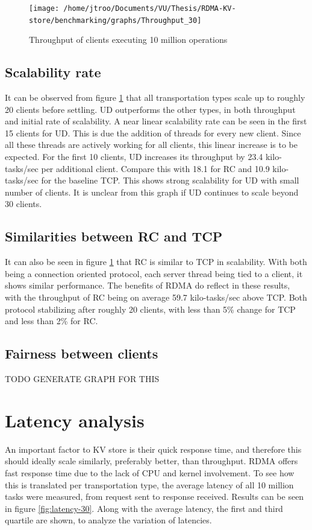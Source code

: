 \begin{figure}
    \centering
    \texttt{[image: /home/jtroo/Documents/VU/Thesis/RDMA-KV-store/benchmarking/graphs/Throughput\_30]}
    \caption{Throughput of clients executing 10 million operations}
    \label{fig:throughput-30}
\end{figure}

\subsection{Scalability rate}\label{subsec:scalability-rate}
It can be observed from figure \ref{fig:throughput-30} that all transportation types scale up to roughly 20 clients before settling.
UD outperforms the other types, in both throughput and initial rate of scalability.
A near linear scalability rate can be seen in the first 15 clients for UD.
This is due the addition of threads for every new client.
Since all these threads are actively working for all clients, this linear increase is to be expected.
For the first 10 clients, UD increases its throughput by 23.4 kilo-tasks/sec per additional client.
Compare this with 18.1 for RC and 10.9 kilo-tasks/sec for the baseline TCP.
This shows strong scalability for UD with small number of clients.
It is unclear from this graph if UD continues to scale beyond 30 clients.

\subsection{Similarities between RC and TCP}
It can also be seen in figure \ref{fig:throughput-30} that RC is similar to TCP in scalability.
With both being a connection oriented protocol, each server thread being tied to a client, it shows similar performance.
The benefits of RDMA do reflect in these results, with the throughput of RC being on average 59.7 kilo-tasks/sec above TCP.
Both protocol stabilizing after roughly 20 clients, with less than 5\% change for TCP and less than 2\% for RC.

\subsection{Fairness between clients}
TODO GENERATE GRAPH FOR THIS

\section{Latency analysis}\label{sec:latency:analysis}
An important factor to KV store is their quick response time, and therefore this should ideally scale similarly, preferably better, than throughput.
RDMA offers fast response time due to the lack of CPU and kernel involvement.
To see how this is translated per transportation type, the average latency of all 10 million tasks were measured, from request sent to response received.
Results can be seen in figure \ref{fig:latency-30}.
Along with the average latency, the first and third quartile are shown, to analyze the variation of latencies.

